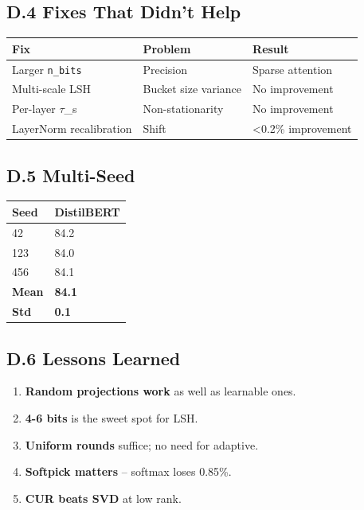 \subsection{D.4 Fixes That Didn't Help}

\begin{table}[H]
\centering
\small
\begin{tabular}{lll}
\toprule
\textbf{Fix} & \textbf{Problem} & \textbf{Result} \\
\midrule
Larger \texttt{n\_bits} & Precision & Sparse attention \\
Multi-scale LSH & Bucket size variance & No improvement \\
Per-layer $\tau$\_s & Non-stationarity & No improvement \\
LayerNorm recalibration & Shift & <0.2\% improvement \\
\bottomrule
\end{tabular}
\end{table}

\subsection{D.5 Multi-Seed}

\begin{table}[H]
\centering
\small
\begin{tabular}{ll}
\toprule
\textbf{Seed} & \textbf{DistilBERT} \\
\midrule
42 & 84.2 \\
123 & 84.0 \\
456 & 84.1 \\
\textbf{Mean} & \textbf{84.1} \\
\textbf{Std} & \textbf{0.1} \\
\bottomrule
\end{tabular}
\end{table}

\subsection{D.6 Lessons Learned}

\begin{enumerate}
\item \textbf{Random projections work} as well as learnable ones.
\item \textbf{4-6 bits} is the sweet spot for LSH.
\item \textbf{Uniform rounds} suffice; no need for adaptive.
\item \textbf{Softpick matters} -- softmax loses 0.85\%.
\item \textbf{CUR beats SVD} at low rank.

\end{enumerate}
